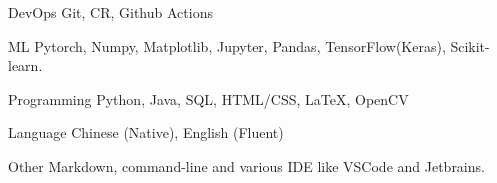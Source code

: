

\begin{cvskills}

  \cvskill
    {DevOps} %
    {Git, CR, Github Actions} %


  \cvskill
    {ML} %
    {Pytorch, Numpy, Matplotlib, Jupyter, Pandas, TensorFlow(Keras), Scikit-learn.} %

  \cvskill
    {Programming} %
    {Python, Java, SQL, HTML/CSS, LaTeX, OpenCV} %

  \cvskill
    {Language} %
    {Chinese (Native), English (Fluent)} %

  \cvskill
    {Other} %
    {Markdown, command-line and various IDE like VSCode and Jetbrains.} %

\end{cvskills}

